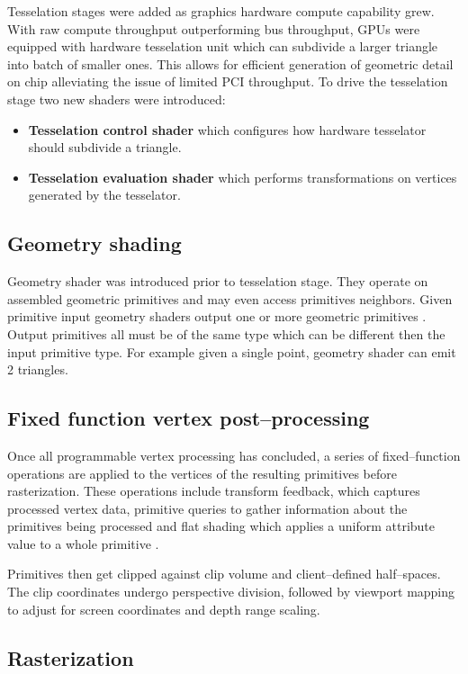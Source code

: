Tesselation stages were added as graphics hardware compute capability grew. With raw compute throughput outperforming bus throughput, GPUs were equipped with hardware
tesselation unit which can subdivide a larger triangle into batch of smaller ones. This allows for efficient generation of geometric detail on chip alleviating the 
issue of limited PCI throughput.
To drive the tesselation stage two new shaders were introduced:
\begin{itemize}
    \item \textbf{Tesselation control shader} which configures how hardware tesselator should subdivide a triangle.
    \item \textbf{Tesselation evaluation shader} which performs transformations on vertices generated by the tesselator.
\end{itemize}

\subsection{Geometry shading}

Geometry shader was introduced prior to tesselation stage. They operate on assembled geometric primitives and may even access primitives neighbors.
Given primitive input geometry shaders output one or more geometric primitives \cite{openglspec}. 
Output primitives all must be of the same type which can be different then the input primitive type.
For example given a single point, geometry shader can emit 2 triangles.

\subsection{Fixed function vertex post--processing}

Once all programmable vertex processing has concluded, a series of fixed--function operations are applied to the vertices of the resulting primitives before rasterization.
These operations include transform feedback, which captures processed vertex data, 
primitive queries to gather information about the primitives being processed 
and flat shading which applies a uniform attribute value to a whole primitive \cite{openglspec}.

Primitives then get clipped against clip volume and client--defined half--spaces.
The clip coordinates undergo perspective division, followed by viewport mapping to adjust for screen coordinates and depth range scaling.

\subsection{Rasterization}

